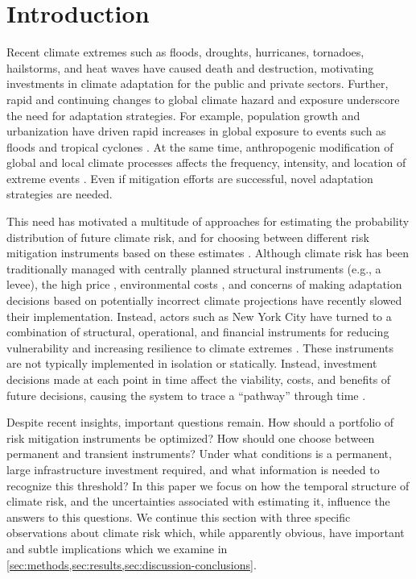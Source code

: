 \documentclass[
  draft,
  linenumbers
]{agujournal2018}
\makeatletter
\newcommand{\eg}{e.g.\@\xspace}
\makeatother
\begin{document}

\section{Introduction}\label{sec:introduction}

Recent climate extremes such as floods, droughts, hurricanes, tornadoes, hailstorms, and heat waves have caused death and destruction, motivating investments in climate adaptation for the public and private sectors.
Further, rapid and continuing changes to global climate hazard and exposure underscore the need for adaptation strategies.
For example, population growth and urbanization have driven rapid increases in global exposure to events such as floods \citep{Jongman:2012cr} and tropical cyclones \citep{Peduzzi:2012iq}.
At the same time, anthropogenic modification of global and local climate processes affects the frequency, intensity, and location of extreme events \citep{IPCC:2012wt, Milly:2008dg, Shaw:2016bo}.
Even if mitigation efforts are successful, novel adaptation strategies are needed.

This need has motivated a multitude of approaches for estimating the probability distribution of future climate risk, and for choosing between different risk mitigation instruments based on these estimates \citep[see, \eg,][]{Merz:2014gf}.
Although climate risk has been traditionally managed with centrally planned structural instruments (\eg, a levee), the high price \citep{Papakonstantinou:2016ve}, environmental costs \citep{dugan:2010}, and concerns of making adaptation decisions based on potentially incorrect climate projections \citep{lempert:2007} have recently slowed their implementation.
Instead, actors such as New York City have turned to a combination of structural, operational, and financial instruments for reducing vulnerability and increasing resilience to climate extremes \citep{CityofNewYork:2013uh}.
These instruments are not typically implemented in isolation or statically.
Instead, investment decisions made at each point in time affect the viability, costs, and benefits of future decisions, causing the system to trace a ``pathway'' through time \citep{Walker:2013gi,Haasnoot:2013im,Haasnoot:2015dh}.

Despite recent insights, important questions remain.
How should a portfolio of risk mitigation instruments be optimized?
How should one choose between permanent and transient instruments?
Under what conditions is a permanent, large infrastructure investment required, and what information is needed to recognize this threshold?
In this paper we focus on how the temporal structure of climate risk, and the uncertainties associated with estimating it, influence the answers to this questions.
We continue this section with three specific observations about climate risk which, while apparently obvious, have important and subtle implications which we examine in \cref{sec:methods,sec:results,sec:discussion-conclusions}.
\end{document}
